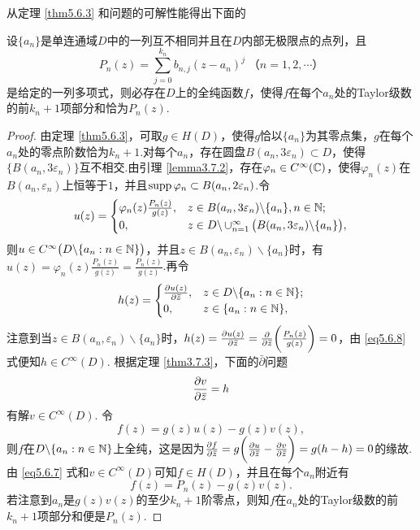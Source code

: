 从定理 \ref{thm5.6.3} 和问题的可解性能得出下面的
\begin{theorem}\label{thm5.6.4}
设$\{a_n\}$是单连通域$D$中的一列互不相同并且在$D$内部无极限点的点列，且
\begin{equation}\label{eq5.6.6}
P_n(z)=\sum_{j=0}^{k_n}b_{n,j}(z-a_n)^j\;\mbox{（$n=1,2,\cdots$）}
\end{equation}
是给定的一列多项式，则必存在$D$上的全纯函数$f$，使得$f$在每个$a_n$处的Taylor级数的前$k_n+1$项部分和恰为$P_n(z)$.
\end{theorem}
\begin{proof}
由定理 \ref{thm5.6.3}，可取$g\in H(D)$，使得$g$恰以$\{a_n\}$为其零点集，$g$在每个$a_n$处的零点阶数恰为$k_n+1$.对每个$a_n$，存在圆盘$B(a_n,3\varepsilon_n)\subset D$，使得$\{B(a_n,3\varepsilon_n)\}$互不相交.由引理 \ref{lemma3.7.2}，存在$\varphi_n\in C^\infty(\mathbb C)$，使得$\varphi_n(z)$在$B(a_n,\varepsilon_n)$上恒等于$1$，并且$\operatorname{supp}\varphi_n\subset B(a_n,2\varepsilon_n)$.令
\begin{equation}\label{eq5.6.7}
u(z)=\begin{cases}
\varphi_n(z)\frac{P_n(z)}{g(z)},&z\in B(a_n,3\varepsilon_n)\backslash\{a_n\},n\in\mathbb N;\\
0,&z\in D\backslash\operatorname*{\cup}_{n=1}^\infty\big(B(a_n,3\varepsilon_n)\backslash
\{a_n\}\big),
\end{cases}
\end{equation}
则$u\in C^\infty\big(D\backslash\{a_n:n\in\mathbb N\}\big)$，并且$z\in B(a_n,\varepsilon_n)\backslash\{a_n\}$时，有$u(z)=\varphi_n(z)\frac{P_n(z)}{g(z)}
=\frac{P_n(z)}{g(z)}$.再令
\begin{equation}\label{eq5.6.8}
h(z)=\begin{cases}
\frac{\partial u(z)}{\partial {}\mkern2mu\overline{\mkern-2muz}},&z\in D\backslash\{a_n:n\in\mathbb N\};\\
0,&z\in\{a_n:n\in\mathbb N\},
\end{cases}
\end{equation}
注意到当$z\in B(a_n,\varepsilon_n)\backslash\{a_n\}$时，$h(z)=\frac{\partial u(z)}{\partial {}\mkern2mu\overline{\mkern-2muz}}
=\frac{\partial }{\partial {}\mkern2mu\overline{\mkern-2muz}}\bigg(\frac{P_n(z)}{g(z)}\bigg)=0$，由 \eqref{eq5.6.8} 式便知$h\in C^\infty(D)$. 根据定理 \ref{thm3.7.3}，下面的$\bar\partial$问题
\[\frac{\partial v}{\partial {}\mkern2mu\overline{\mkern-2muz}}=h\]
有解$v\in C^\infty(D)$. 令
\[f(z)=g(z)u(z)-g(z)v(z),\]
则$f$在$D\backslash\{a_n:n\in\mathbb N\}$上全纯，这是因为$\frac{\partial f}{\partial {}\mkern2mu\overline{\mkern-2muz}}=g\bigg(\frac{\partial u}{\partial {}\mkern2mu\overline{\mkern-2muz}}-\frac{\partial v}{\partial {}\mkern2mu\overline{\mkern-2muz}}\bigg)=g(h-h)=0$的缘故. 由 \eqref{eq5.6.7} 式和$v\in C^\infty(D)$可知$f\in H(D)$，并且在每个$a_n$附近有
\[f(z)=P_n(z)-g(z)v(z).\]
若注意到$a_n$是$g(z)v(z)$的至少$k_n+1$阶零点，则知$f$在$a_n$处的Taylor级数的前$k_n+1$项部分和便是$P_n(z)$.
\end{proof}

